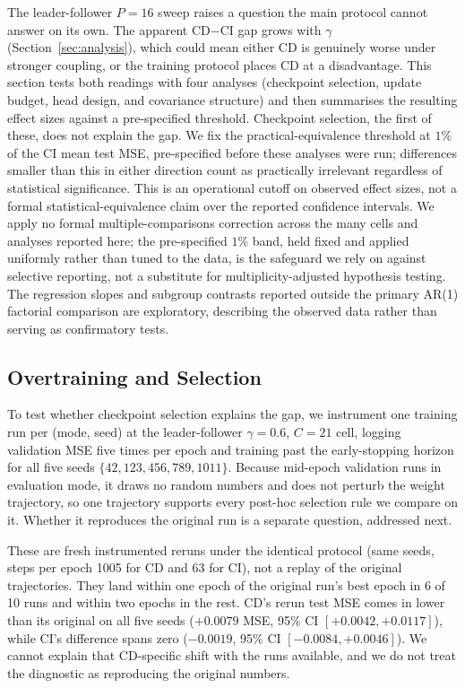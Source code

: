 \documentclass[10pt]{article} %
\begin{document}
    The leader-follower $P = 16$ sweep raises a question the main protocol cannot answer on its own. The apparent CD$-$CI
    gap grows with $\gamma$ (Section~\ref{sec:analysis}), which could mean either CD is genuinely worse under stronger coupling, or
    the training protocol places CD at a disadvantage. This section tests both readings with four analyses (checkpoint selection,
    update budget, head design, and covariance structure) and then summarises the resulting effect sizes against a pre-specified
    threshold. Checkpoint selection, the first of these, does not explain the gap. We fix the practical-equivalence threshold at
    $1\%$ of the CI mean test MSE, pre-specified before these analyses were run; differences smaller than this in either direction
    count as practically irrelevant regardless of statistical significance. This is an operational cutoff on observed effect sizes,
    not a formal statistical-equivalence claim over the reported confidence intervals. We apply no formal multiple-comparisons
    correction across the many cells and analyses reported here; the pre-specified $1\%$ band, held fixed and applied uniformly
    rather than tuned to the data, is the safeguard we rely on against selective reporting, not a substitute for
    multiplicity-adjusted hypothesis testing. The regression slopes and subgroup contrasts reported outside the primary AR(1)
    factorial comparison are exploratory, describing the observed data rather than serving as confirmatory tests.

    \subsection{Overtraining and Selection}
    \label{subsec:overtrain}

    To test whether checkpoint selection explains the gap, we instrument one training run per (mode, seed) at the
    leader-follower $\gamma = 0.6$, $C = 21$ cell, logging validation MSE five times per epoch and training past the
    early-stopping horizon for all five seeds $\{42, 123, 456, 789, 1011\}$. Because mid-epoch validation runs in
    evaluation mode, it draws no random numbers and does not perturb the weight trajectory, so one trajectory supports
    every post-hoc selection rule we compare on it. Whether it reproduces the original run is a separate
    question, addressed next.

    These are fresh instrumented reruns under the identical protocol (same seeds, steps per epoch 1005 for CD and 63 for CI),
    not a replay of the original trajectories. They land within one epoch of the original run's best epoch in 6 of 10 runs and
    within two epochs in the rest. CD's rerun test MSE comes in lower than its original on all five seeds ($+0.0079$ MSE,
    95\% CI $[+0.0042, +0.0117]$), while CI's difference spans zero ($-0.0019$, 95\% CI $[-0.0084, +0.0046]$). We cannot
    explain that CD-specific shift with the runs available, and we do not treat the diagnostic as reproducing the original
    numbers.
\end{document}
